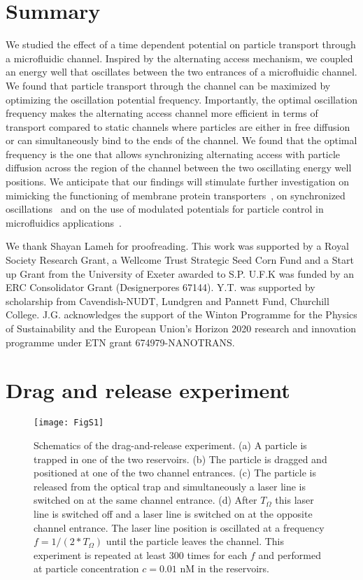 \documentclass[
 reprint,
 aps, showkeys, showpacs
]{revtex4-1}
\begin{document}
\section{Summary}

We studied the effect of a time dependent potential on particle transport through a microfluidic channel. Inspired by the alternating access mechanism, we coupled an energy well that oscillates between the two entrances of a microfluidic channel. We found that particle transport through the channel can be maximized by optimizing the oscillation potential frequency. Importantly, the optimal oscillation frequency makes the alternating access channel more efficient in terms of transport compared to static channels where particles are either in free diffusion or can simultaneously bind to the ends of the channel. We found that the optimal frequency is the one that allows synchronizing alternating access with particle diffusion across the region of the channel between the two oscillating energy well positions. We anticipate that our findings will stimulate further investigation on mimicking the functioning of membrane protein transporters~\cite{Caspi2008}, on synchronized oscillations~\cite{Doering1992,Schmitt2006,Hayashi2012,Juniper2015} and on the use of modulated potentials for particle control in microfluidics applications~\cite{MacDonald2003}.

\begin{acknowledgments}
We thank Shayan Lameh for proofreading. This work was supported by a Royal Society Research Grant, a Wellcome Trust Strategic Seed Corn Fund and a Start up Grant from the University of Exeter awarded to S.P. U.F.K was funded by an ERC Consolidator Grant (Designerpores 67144). Y.T. was supported by scholarship from Cavendish-NUDT, Lundgren and Pannett Fund, Churchill College. J.G. acknowledges the support of the Winton Programme for the Physics of Sustainability and the European Union's Horizon 2020 research and innovation programme under ETN grant 674979-NANOTRANS. 
\end{acknowledgments}

\appendix
\section{Drag and release experiment}\label{appendix1}
\begin{figure}[H]
	\texttt{[image: FigS1]}
	\caption{\label{S3} Schematics of the drag-and-release experiment. (a) A particle is trapped in one of the two reservoirs. (b) The particle is dragged and positioned at one of the two channel entrances. (c) The particle is released from the optical trap and simultaneously a laser line is switched on at the same channel entrance. (d) After $T_{\Omega}$ this laser line is switched off and a laser line is switched on at the opposite channel entrance. The laser line position is oscillated at a frequency $f=1/(2*T_{\Omega})$ until the particle leaves the channel. This experiment is repeated at least 300 times for each $f$ and performed at particle concentration $c= 0.01$ nM in the reservoirs.}
\end{figure}
\end{document}
